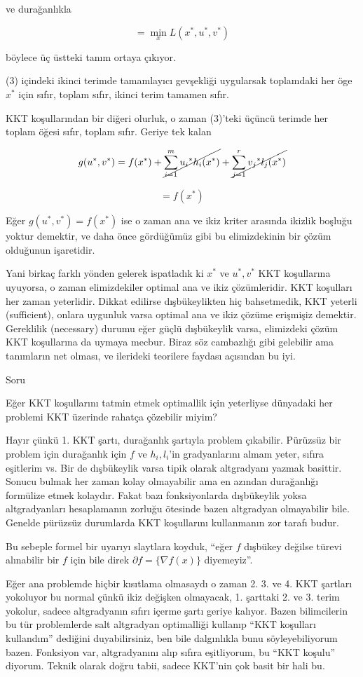 \documentclass[12pt,fleqn]{article}\usepackage{../../common}
\begin{document}
ve durağanlıkla 

$$
= \min_x L(x^*,u^*,v^*)
$$

böylece üç üstteki tanım ortaya çıkıyor. 

(3) içindeki ikinci terimde tamamlayıcı gevşekliği uygularsak toplamdaki
her öge $x^*$ için sıfır, toplam sıfır, ikinci terim tamamen sıfır.

KKT koşullarından bir diğeri olurluk, o zaman (3)'teki üçüncü terimde her
toplam öğesi sıfır, toplam sıfır. Geriye tek kalan

$$
g(u^*,v^*) = f(x^*) + 
\cancel{\sum_{i=1}^{m} u_i{^*} h_i(x^*)} + 
\cancel{\sum_{j=1}^{r} v_j{^*} l_j(x^*)}
$$

$$
= f(x^*)
$$

Eğer $g(u^*,v^*) = f(x^*)$ ise o zaman ana ve ikiz kriter arasında ikizlik
boşluğu yoktur demektir, ve daha önce gördüğümüz gibi bu elimizdekinin bir
çözüm olduğunun işaretidir. 

Yani birkaç farklı yönden gelerek ispatladık ki $x^*$ ve $u^*,v^*$ KKT
koşullarına uyuyorsa, o zaman elimizdekiler optimal ana ve ikiz
çözümleridir. KKT koşulları her zaman yeterlidir. Dikkat edilirse
dışbükeylikten hiç bahsetmedik, KKT yeterli (sufficient), onlara uygunluk
varsa optimal ana ve ikiz çözüme erişmişiz demektir. Gereklilik (necessary)
durumu eğer güçlü dışbükeylik varsa, elimizdeki çözüm KKT koşullarına da
uymaya mecbur. Biraz söz cambazlığı gibi gelebilir ama tanımların net
olması, ve ilerideki teorilere faydası açısından bu iyi. 

Soru

Eğer KKT koşullarını tatmin etmek optimallik için yeterliyse dünyadaki her
problemi KKT üzerinde rahatça çözebilir miyim?

Hayır çünkü 1. KKT şartı, durağanlık şartıyla problem çıkabilir. Pürüzsüz
bir problem için durağanlık için $f$ ve $h_i,l_i$'in gradyanlarını almam
yeter, sıfıra eşitlerim vs. Bir de dışbükeylik varsa tipik olarak
altgradyanı yazmak basittir. Sonucu bulmak her zaman kolay olmayabilir ama
en azından durağanlığı formülize etmek kolaydır. Fakat bazı fonksiyonlarda
dışbükeylik yoksa altgradyanları hesaplamanın zorluğu ötesinde bazen
altgradyan olmayabilir bile. Genelde pürüzsüz durumlarda KKT koşullarını
kullanmanın zor tarafı budur.

Bu sebeple formel bir uyarıyı slaytlara koyduk, ``eğer $f$ dışbükey değilse
türevi alınabilir bir $f$ için bile direk $\partial f = \{\nabla f(x)\}$
diyemeyiz''. 

Eğer ana problemde hiçbir kısıtlama olmasaydı o zaman 2. 3. ve 4. KKT
şartları yokoluyor bu normal çünkü ikiz değişken olmayacak, 1. şarttaki
2. ve 3. terim yokolur, sadece altgradyanın sıfırı içerme şartı geriye
kalıyor. Bazen bilimcilerin bu tür problemlerde salt altgradyan optimalliği
kullanıp ``KKT koşulları kullandım'' dediğini duyabilirsiniz, ben bile
dalgınlıkla bunu söyleyebiliyorum bazen. Fonksiyon var, altgradyanını alıp
sıfıra eşitliyorum, bu ``KKT koşulu'' diyorum. Teknik olarak doğru tabii,
sadece KKT'nin çok basit bir hali bu.
\end{document}
